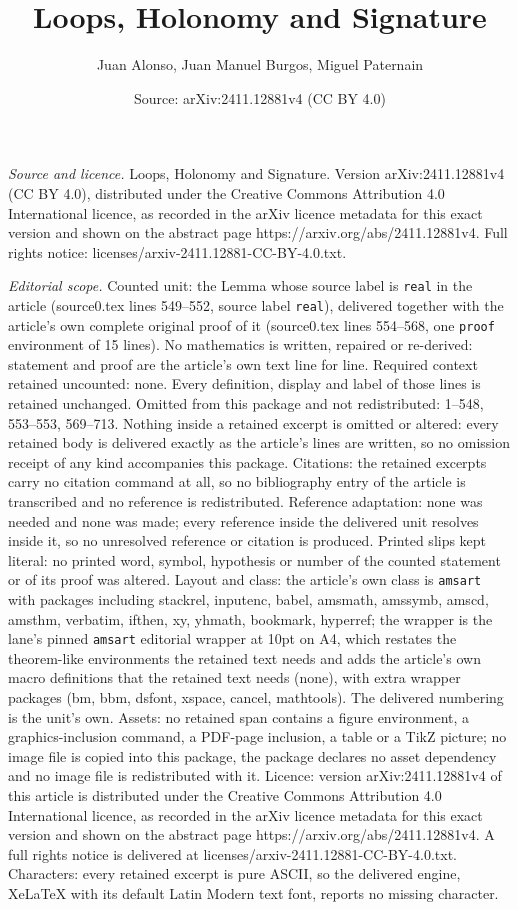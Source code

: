 \documentclass[10pt,a4paper]{amsart}
\title[Loops, Holonomy and Signature]{Loops, Holonomy and Signature}
\author{Juan Alonso, Juan Manuel Burgos, Miguel Paternain}
\date{Source: arXiv:2411.12881v4 (CC BY 4.0)}
\begin{document}
\maketitle

\noindent\emph{Source and licence.} Loops, Holonomy and Signature. Version arXiv:2411.12881v4 (CC BY 4.0), distributed under the Creative Commons Attribution 4.0 International licence, as recorded in the arXiv licence metadata for this exact version and shown on the abstract page https://arxiv.org/abs/2411.12881v4. Full rights notice: licenses/arxiv-2411.12881-CC-BY-4.0.txt.\par\smallskip

\noindent\textit{Editorial scope.} Counted unit: the Lemma whose source label is \texttt{real} in the article (source0.tex lines 549--552, source label \texttt{real}), delivered together with the article's own complete original proof of it (source0.tex lines 554--568, one \texttt{proof} environment of 15 lines). No mathematics is written, repaired or re-derived: statement and proof are the article's own text line for line. Required context retained uncounted: none. Every definition, display and label of those lines is retained unchanged. Omitted from this package and not redistributed: 1--548, 553--553, 569--713. Nothing inside a retained excerpt is omitted or altered: every retained body is delivered exactly as the article's lines are written, so no omission receipt of any kind accompanies this package. Citations: the retained excerpts carry no citation command at all, so no bibliography entry of the article is transcribed and no reference is redistributed. Reference adaptation: none was needed and none was made; every reference inside the delivered unit resolves inside it, so no unresolved reference or citation is produced. Printed slips kept literal: no printed word, symbol, hypothesis or number of the counted statement or of its proof was altered. Layout and class: the article's own class is \texttt{amsart} with packages including stackrel, inputenc, babel, amsmath, amssymb, amscd, amsthm, verbatim, ifthen, xy, yhmath, bookmark, hyperref; the wrapper is the lane's pinned \texttt{amsart} editorial wrapper at 10pt on A4, which restates the theorem-like environments the retained text needs and adds the article's own macro definitions that the retained text needs (none), with extra wrapper packages (bm, bbm, dsfont, xspace, cancel, mathtools). The delivered numbering is the unit's own. Assets: no retained span contains a figure environment, a graphics-inclusion command, a PDF-page inclusion, a table or a TikZ picture; no image file is copied into this package, the package declares no asset dependency and no image file is redistributed with it. Licence: version arXiv:2411.12881v4 of this article is distributed under the Creative Commons Attribution 4.0 International licence, as recorded in the arXiv licence metadata for this exact version and shown on the abstract page https://arxiv.org/abs/2411.12881v4. A full rights notice is delivered at licenses/arxiv-2411.12881-CC-BY-4.0.txt. Characters: every retained excerpt is pure ASCII, so the delivered engine, XeLaTeX with its default Latin Modern text font, reports no missing character.
\end{document}

